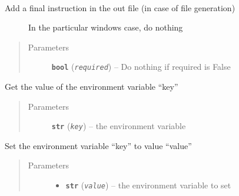 \documentclass[a4paper,10pt,english]{sphinxmanual}
\begin{document}
\begin{fulllineitems}
\begin{fulllineitems}
\begin{quote}
\begin{description}
\begin{itemize}
\end{itemize}

\end{description}\end{quote}

\end{fulllineitems}


\begin{fulllineitems}
\label{commands/apidoc/src:src.fileEnviron.BatFileEnviron.finish}~\begin{description}
\item[{Add a final instruction in the out file (in case of file generation)}] \leavevmode
In the particular windows case, do nothing

\end{description}
\begin{quote}\begin{description}
\item[{Parameters}] \leavevmode
\textbf{\texttt{bool}} (\emph{\texttt{required}}) -- Do nothing if required is False

\end{description}\end{quote}

\end{fulllineitems}


\begin{fulllineitems}
\label{commands/apidoc/src:src.fileEnviron.BatFileEnviron.get}
Get the value of the environment variable ``key''
\begin{quote}\begin{description}
\item[{Parameters}] \leavevmode
\textbf{\texttt{str}} (\emph{\texttt{key}}) -- the environment variable

\end{description}\end{quote}

\end{fulllineitems}


\begin{fulllineitems}
\label{commands/apidoc/src:src.fileEnviron.BatFileEnviron.set}
Set the environment variable ``key'' to value ``value''
\begin{quote}\begin{description}
\item[{Parameters}] \leavevmode\begin{itemize}
\item {} 
\textbf{\texttt{str}} (\emph{\texttt{value}}) -- the environment variable to set


\end{itemize}
\end{description}
\end{quote}
\end{fulllineitems}
\end{fulllineitems}
\end{document}
